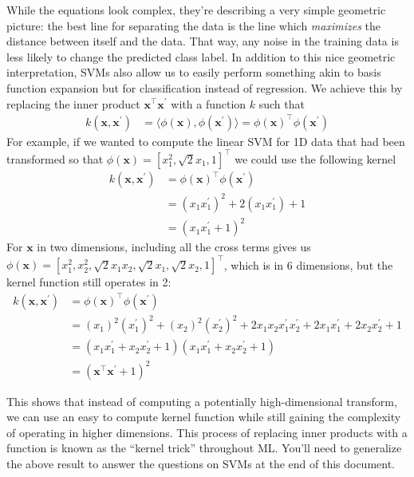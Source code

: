 \documentclass{article}
\begin{document}
While the equations look complex, they're describing a very simple geometric picture: the best line for separating the data is the line which \emph{maximizes} the distance between itself and the data. That way, any noise in the training data is less likely to change the predicted class label. In addition to this nice geometric interpretation, SVMs also allow us to easily perform something akin to basis function expansion but for classification instead of regression. We achieve this by replacing the inner product \(\mathbf{x}^\top\mathbf{x}^\prime\) with a function \(k\) such that
\begin{align*}
	k(\mathbf{x},\mathbf{x}^\prime) &= \langle\phi(\mathbf{x}), \phi(\mathbf{x}^\prime)\rangle = \phi(\mathbf{x})^\top \phi(\mathbf{x}^\prime)
\end{align*}
For example, if we wanted to compute the linear SVM for 1D data that had been transformed so that \(\phi(\mathbf{x}) = [x_1^2, \sqrt{2} x_1, 1]^\top\) we could use the following kernel
\begin{align*}
	k(\mathbf{x},\mathbf{x}^\prime) &= \phi(\mathbf{x})^\top\phi(\mathbf{x}^\prime)\\
	&= (x_1 x_1^\prime)^2 + 2(x_1 x_1^\prime) + 1\\
	&= (x_1 x_1^\prime +1)^2
\end{align*}
For \(\mathbf{x}\) in two dimensions, including all the cross terms gives us \(\phi(\mathbf{x}) = [x_1^2, x_2^2, \sqrt{2} x_1 x_2, \sqrt{2} x_1, \sqrt{2} x_2, 1]^\top\), which is in 6 dimensions, but the kernel function still operates in 2:
\begin{align*}
	k(\mathbf{x},\mathbf{x}^\prime) &= \phi(\mathbf{x})^\top\phi(\mathbf{x}^\prime)\\
	&= (x_1)^2 (x_1^\prime)^2 + (x_2)^2(x_2^\prime)^2 + 2 x_1 x_2 x_1^\prime x_2^\prime + 2 x_1 x_1^\prime + 2 x_2 x_2^\prime +1 \\
	&= (x_1 x_1^\prime + x_2 x_2^\prime +1)(x_1 x_1^\prime + x_2 x_2^\prime +1)\\
	&= (\mathbf{x}^\top\mathbf{x}^\prime +1)^2
\end{align*}

This shows that instead of computing a potentially high-dimensional transform, we can use an easy to compute kernel function while still gaining the complexity of operating in higher dimensions. This process of replacing inner products with a function is known as the ``kernel trick'' throughout ML.  You'll need to generalize the above result to answer the questions on SVMs at the end of this document.
\end{document}

